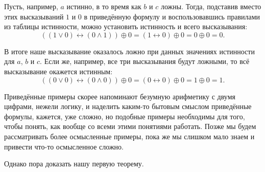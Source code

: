 Пусть, например, $a$ истинно, в то время как $b$ и $c$ ложны. Тогда, подставив вместо этих высказываний $1$ и $0$ в приведённую формулу и воспользовавшись правилами из таблицы истинности, можно установить истинность и всего высказывания:
$$
((1 \lor 0) \leftrightarrow (0 \land 1)) \oplus 0 = (1 \leftrightarrow 0) \oplus 0 = 0 \oplus 0 = 0.
$$

В итоге наше высказывание оказалось ложно при данных значениях истинности для $a$, $b$ и $c$. Если же, например, все три высказывания будут ложными, то всё высказывание окажется истинным:
$$
((0 \lor 0) \leftrightarrow (0 \land 0)) \oplus 0 = (0 \leftrightarrow 0) \oplus 0 = 1 \oplus 0 = 1.
$$

Приведённые примеры скорее напоминают безумную арифметику с двумя цифрами, нежели логику, и наделить каким-то бытовым смыслом приведённые формулы, кажется, уже сложно, но подобные примеры необходимы для того, чтобы понять, как вообще со всеми этими понятиями работать. Позже мы будем рассматривать более осмысленные примеры, пока же мы слишком мало знаем и привести что-то осмысленное сложно.

Однако пора доказать нашу первую теорему.

